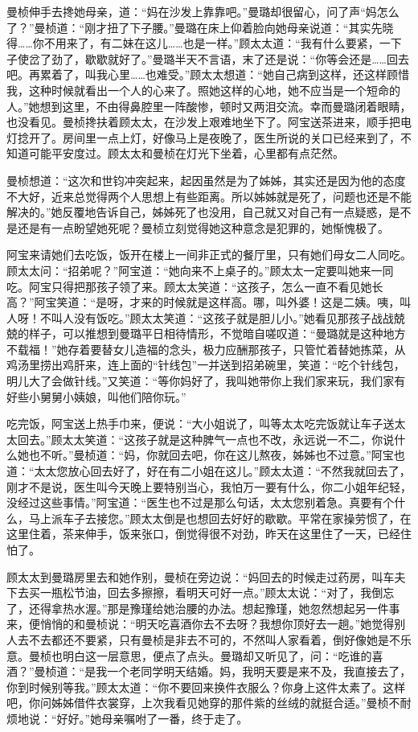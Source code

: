 \par 曼桢伸手去搀她母亲，道：“妈在沙发上靠靠吧。”曼璐却很留心，问了声“妈怎么了？”曼桢道：“刚才扭了下子腰。”曼璐在床上仰着脸向她母亲说道：“其实先晓得……你不用来了，有二妹在这儿……也是一样。”顾太太道：“我有什么要紧，一下子使岔了劲了，歇歇就好了。”曼璐半天不言语，末了还是说：“你等会还是……回去吧。再累着了，叫我心里……也难受。”顾太太想道：“她自己病到这样，还这样顾惜我，这种时候就看出一个人的心来了。照她这样的心地，她不应当是一个短命的人。”她想到这里，不由得鼻腔里一阵酸惨，顿时又两泪交流。幸而曼璐闭着眼睛，也没看见。曼桢搀扶着顾太太，在沙发上艰难地坐下了。阿宝送茶进来，顺手把电灯捻开了。房间里一点上灯，好像马上是夜晚了，医生所说的关口已经来到了，不知道可能平安度过。顾太太和曼桢在灯光下坐着，心里都有点茫然。
\par 曼桢想道：“这次和世钧冲突起来，起因虽然是为了姊姊，其实还是因为他的态度不大好，近来总觉得两个人思想上有些距离。所以姊姊就是死了，问题也还是不能解决的。”她反覆地告诉自己，姊姊死了也没用，自己就又对自己有一点疑惑，是不是还是有一点盼望她死呢？曼桢立刻觉得她这种意念是犯罪的，她惭愧极了。
\par 阿宝来请她们去吃饭，饭开在楼上一间非正式的餐厅里，只有她们母女二人同吃。顾太太问：“招弟呢？”阿宝道：“她向来不上桌子的。”顾太太一定要叫她来一同吃。阿宝只得把那孩子领了来。顾太太笑道：“这孩子，怎么一直不看见她长高？”阿宝笑道：“是呀，才来的时候就是这样高。哪，叫外婆！这是二姨。咦，叫人呀！不叫人没有饭吃。”顾太太笑道：“这孩子就是胆儿小。”她看见那孩子战战兢兢的样子，可以推想到曼璐平日相待情形，不觉暗自嗟叹道：“曼璐就是这种地方不载福！”她存着要替女儿造福的念头，极力应酬那孩子，只管忙着替她拣菜，从鸡汤里捞出鸡肝来，连上面的“针线包”一并送到招弟碗里，笑道：“吃个针线包，明儿大了会做针线。”又笑道：“等你妈好了，我叫她带你上我们家来玩，我们家有好些小舅舅小姨娘，叫他们陪你玩。”
\par 吃完饭，阿宝送上热手巾来，便说：“大小姐说了，叫等太太吃完饭就让车子送太太回去。”顾太太笑道：“这孩子就是这种脾气一点也不改，永远说一不二，你说什么她也不听。”曼桢道：“妈，你就回去吧，你在这儿熬夜，姊姊也不过意。”阿宝也道：“太太您放心回去好了，好在有二小姐在这儿。”顾太太道：“不然我就回去了，刚才不是说，医生叫今天晚上要特别当心，我怕万一要有什么，你二小姐年纪轻，没经过这些事情。”阿宝道：“医生也不过是那么句话，太太您别着急。真要有个什么，马上派车子去接您。”顾太太倒是也想回去好好的歇歇。平常在家操劳惯了，在这里住着，茶来伸手，饭来张口，倒觉得很不对劲，昨天在这里住了一天，已经住怕了。
\par 顾太太到曼璐房里去和她作别，曼桢在旁边说：“妈回去的时候走过药房，叫车夫下去买一瓶松节油，回去多擦擦，看明天可好一点。”顾太太说：“对了，我倒忘了，还得拿热水渥。”那是豫瑾给她治腰的办法。想起豫瑾，她忽然想起另一件事来，便悄悄的和曼桢说：“明天吃喜酒你去不去呀？我想你顶好去一趟。”她觉得别人去不去都还不要紧，只有曼桢是非去不可的，不然叫人家看着，倒好像她是不乐意。曼桢也明白这一层意思，便点了点头。曼璐却又听见了，问：“吃谁的喜酒？”曼桢道：“是我一个老同学明天结婚。妈，我明天要是来不及，我直接去了，你到时候别等我。”顾太太道：“你不要回来换件衣服么？你身上这件太素了。这样吧，你问姊姊借件衣裳穿，上次我看见她穿的那件紫的丝绒的就挺合适。”曼桢不耐烦地说：“好好。”她母亲嘱咐了一番，终于走了。
